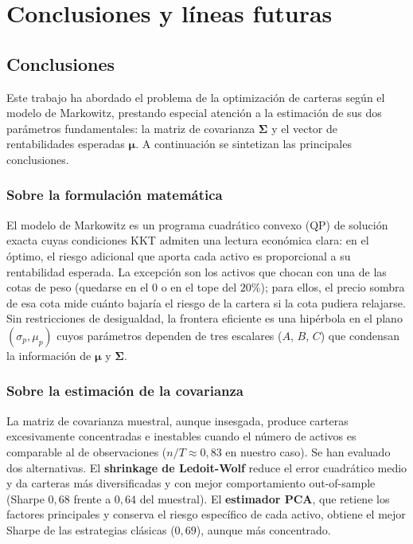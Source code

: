 \chapter{Conclusiones y líneas futuras}
\label{ch:conclusiones}

\section{Conclusiones}

Este trabajo ha abordado el problema de la optimización de carteras según
el modelo de Markowitz, prestando especial atención a la estimación de sus
dos parámetros fundamentales: la matriz de covarianza $\boldsymbol{\Sigma}$
y el vector de rentabilidades esperadas $\boldsymbol{\mu}$. A continuación
se sintetizan las principales conclusiones.

\subsection{Sobre la formulación matemática}

El modelo de Markowitz es un programa cuadrático convexo (QP) de solución exacta
cuyas condiciones KKT admiten una lectura económica clara: en el óptimo, el
riesgo adicional que aporta cada activo es proporcional a su rentabilidad
esperada. La excepción son los activos que chocan con una de las cotas de peso
(quedarse en el $0$ o en el tope del $20\%$); para ellos, el precio sombra de
esa cota mide cuánto bajaría el riesgo de la cartera si la cota pudiera
relajarse. Sin restricciones de desigualdad, la frontera eficiente es una hipérbola
en el plano $(\sigma_p, \mu_p)$ cuyos parámetros dependen de tres escalares
($A$, $B$, $C$) que condensan la información de $\boldsymbol{\mu}$ y
$\boldsymbol{\Sigma}$.

\subsection{Sobre la estimación de la covarianza}

La matriz de covarianza muestral, aunque insesgada, produce
carteras excesivamente concentradas e inestables cuando el número de activos
es comparable al de observaciones ($n/T \approx 0{,}83$ en nuestro caso).
Se han evaluado dos alternativas. El \textbf{shrinkage de Ledoit-Wolf} reduce el
error cuadrático medio y da carteras más diversificadas y con mejor
comportamiento out-of-sample (Sharpe $0{,}68$ frente a $0{,}64$ del muestral). El
\textbf{estimador PCA}, que retiene los factores principales y conserva el riesgo
específico de cada activo, obtiene el mejor Sharpe de las estrategias clásicas
($0{,}69$), aunque más concentrado.

